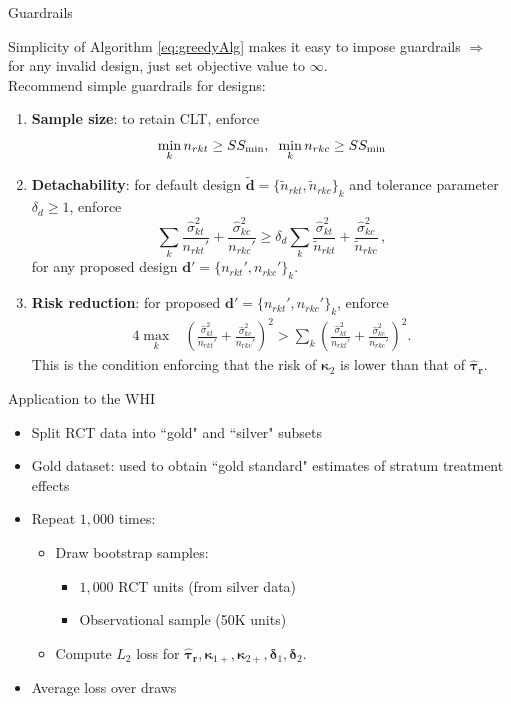 \documentclass[usenames,dvipsnames]{beamer}
\newcommand{\taur}{\boldsymbol{\hat \tau_r}}
\newcommand{\htaur}{\boldsymbol{\hat \tau_r}}
\newcommand{\bsdelt}{\boldsymbol{\delta}}
\newcommand{\bskap}{\boldsymbol{ \kappa}}
\theoremstyle{definition} %
\begin{document}
\begin{frame}{Guardrails}

Simplicity of Algorithm \ref{eq:greedyAlg} makes it easy to impose guardrails $\Longrightarrow$ \\
\hspace{5mm} for any invalid design, just set objective value to $\infty$.\\
\vspace{3mm}
Recommend simple guardrails for designs:

\begin{enumerate}
\item \textbf{Sample size}: to retain CLT, enforce 
\[ \min_k n_{rkt} \geq SS_{\text{min}}, \hspace{2mm} \min_k n_{rkc} \geq SS_{\text{min}} \] 
\item  \textbf{Detachability}: for default design $\boldsymbol{\tilde d} =  \{\tilde n_{rkt}, \tilde n_{rkc}\}_k$ and tolerance parameter  $\delta_d \geq 1$, enforce 
\[ \sum_k  \frac{\hat \sigma_{kt}^2}{n_{rkt}'} + \frac{\hat \sigma_{kc}^2}{n_{rkc}'} \geq \delta_d \sum_k  \frac{\hat \sigma_{kt}^2}{\tilde n_{rkt}} + \frac{\hat \sigma_{kc}^2}{\tilde n_{rkc}}\,, \] 
for any proposed design $\boldsymbol{d'} = \{n_{rkt}', n_{rkc}'\}_k$. 
\item \textbf{Risk reduction}: for proposed $\boldsymbol{d'} = \{n_{rkt}', n_{rkc}'\}_k$, enforce
\begin{align*}
4 \max_k & \left( \frac{\hat \sigma_{kt}^2}{n_{rkt}'} + \frac{\hat \sigma_{kc}^2}{n_{rkc}'} \right)^2 >  
 \sum_k \left(  \frac{\hat \sigma_{kt}^2}{n_{rkt}'} + \frac{\hat \sigma_{kc}^2}{n_{rkc}'} \right)^2. 
\end{align*}
This is the condition enforcing that the risk of $\bskap_{2}$ is lower than that of $\taur$. 
\end{enumerate}
\end{frame}


\begin{frame}{Application to the WHI}
\begin{itemize}
\item Split RCT data into ``gold" and ``silver" subsets
\item Gold dataset: used to obtain ``gold standard" estimates of stratum treatment effects
\item Repeat $1,000$ times:
\begin{itemize}
\item Draw bootstrap samples:
\begin{itemize}
\item $1,000$ RCT units (from silver data)
\item Observational sample (50K units)
\end{itemize} 
\item Compute $L_2$ loss for $\htaur, \bskap_{1+}, \bskap_{2+}, \bsdelt_1, \bsdelt_2$. 
\end{itemize}
\item Average loss over draws 
\end{itemize}
\end{frame}
\end{document}
